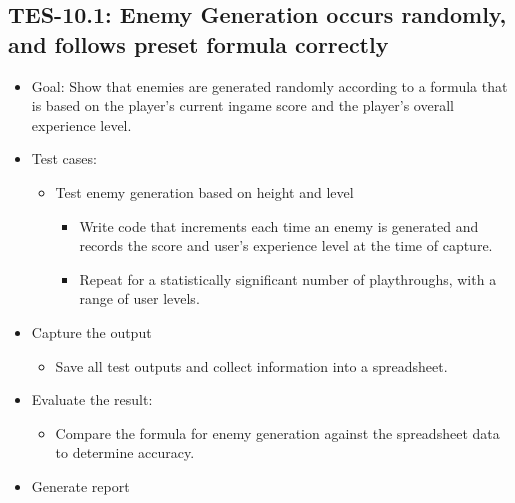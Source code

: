 \subsection{TES-10.1: Enemy Generation occurs randomly, and follows preset formula correctly }
\begin{itemize}
\item Goal: Show that enemies are generated randomly according to a formula that is based 
on the player's current ingame score and the player's overall experience level.
\item Test cases: 

\begin{itemize}
\item Test enemy generation based on height and level

\begin{itemize}
\item Write code that increments each time an enemy is generated and records the score and user's experience
level at the time of capture.
\item Repeat for a statistically significant number of playthroughs, with a range of user levels.

\end{itemize}

\end{itemize}
\item Capture the output
\begin{itemize}
\item Save all test outputs and collect information into a spreadsheet.
\end{itemize}
\item Evaluate the result: 

\begin{itemize}
\item Compare the formula for enemy generation against the spreadsheet data to determine accuracy.
\end{itemize}
\item Generate report
\end{itemize}

